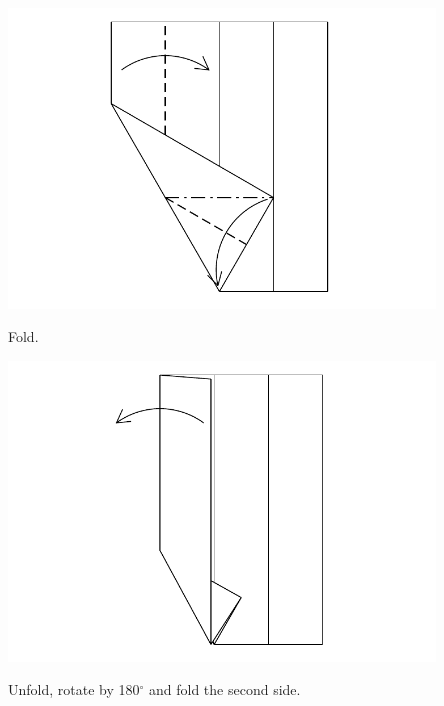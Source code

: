 \documentclass[11pt]{article}
\begin{document}
\begin{minipage}[t]{0.3\textwidth}
  \includegraphics[width=0.85\textwidth]{../figs/fig03-07}
  \begin{itemize}{\item[7.] Fold.}\end{itemize}
\end{minipage}
\begin{minipage}[t]{0.3\textwidth}
  \includegraphics[width=0.85\textwidth]{../figs/fig03-08}
  \begin{itemize}{\item[8.] Unfold, rotate by 180$^\circ$ and fold the second side.}\end{itemize}
\end{minipage}
\end{document}
